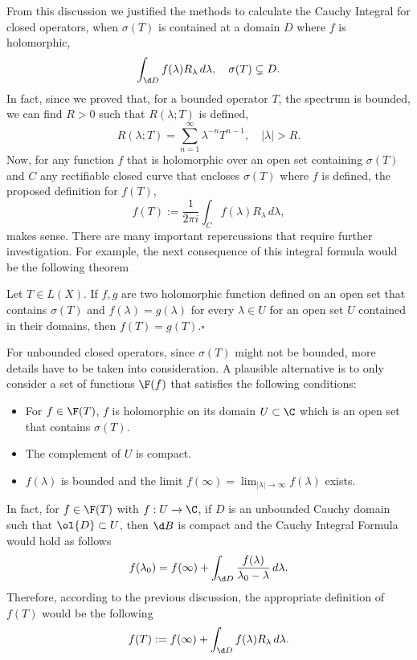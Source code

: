 From this discussion we justified the methods to calculate the Cauchy Integral for closed operators, when $\sigma(T)$ is contained at a domain $D$ where $f$ is holomorphic,
\[ \int_{\d D} f(\lambda) R_\lambda\, d\lambda,\quad \sigma(T) \subsetneq D. \]
In fact, since we proved that, for a bounded operator $T$, the spectrum is bounded, we can find $R > 0$ such that $R(\lambda; T)$ is defined,
\[ R(\lambda; T) = \sum_{n = 1}^{\infty} \lambda^{-n} T^{n-1},\quad |\lambda| > R. \]
Now, for any function $f$ that is holomorphic over an open set containing $\sigma(T)$ and $C$ any rectifiable closed curve that encloses $\sigma(T)$ where $f$ is defined, the proposed definition for $f(T)$,
\[ f(T) := \frac{1}{2\pi i} \int_C f(\lambda) R_\lambda\, d\lambda,\]
makes sense. There are many important repercussions that require further investigation. For example, the next consequence of this integral formula would be the following theorem

\begin{theorem}
    Let $T \in L(X)$. If $f,g$ are two holomorphic function defined on an open set that contains $\sigma(T)$ and $f(\lambda) = g(\lambda)$ for every $\lambda \in U$ for an open set $U$ contained in their domains, then $f(T) = g(T)$.\hfill $\square$
\end{theorem}

For unbounded closed operators, since $\sigma(T)$ might not be bounded, more details have to be taken into consideration. A plausible alternative is to only consider a set of functions $\F(f)$ that satisfies the following conditions:
\begin{itemize}
    \item For $f \in \F(T)$, $f$ is holomorphic on its domain $U\subset \C$ which is an open set that contains $\sigma(T)$.
    \item The complement of $U$ is compact.
    \item $f(\lambda)$ is bounded and the limit $f(\infty) = \lim_{|\lambda|\to\infty}f(\lambda)$ exists.
\end{itemize}

In fact, for $f\in \F(T)$ with $f: U \to \C$, if $D$ is an unbounded Cauchy domain such that $\ol{D} \subset U$, then $\d B$ is compact and the Cauchy Integral Formula would hold as follows
\[ f(\lambda_0) = f(\infty) + \int_{\d D}  \frac{f(\lambda)}{\lambda_0-\lambda}\, d\lambda. \]
Therefore, according to the previous discussion, the appropriate definition of $f(T)$ would be the following
\[ f(T) :=  f(\infty) + \int_{\d D} f(\lambda) R_\lambda\, d\lambda.\]


